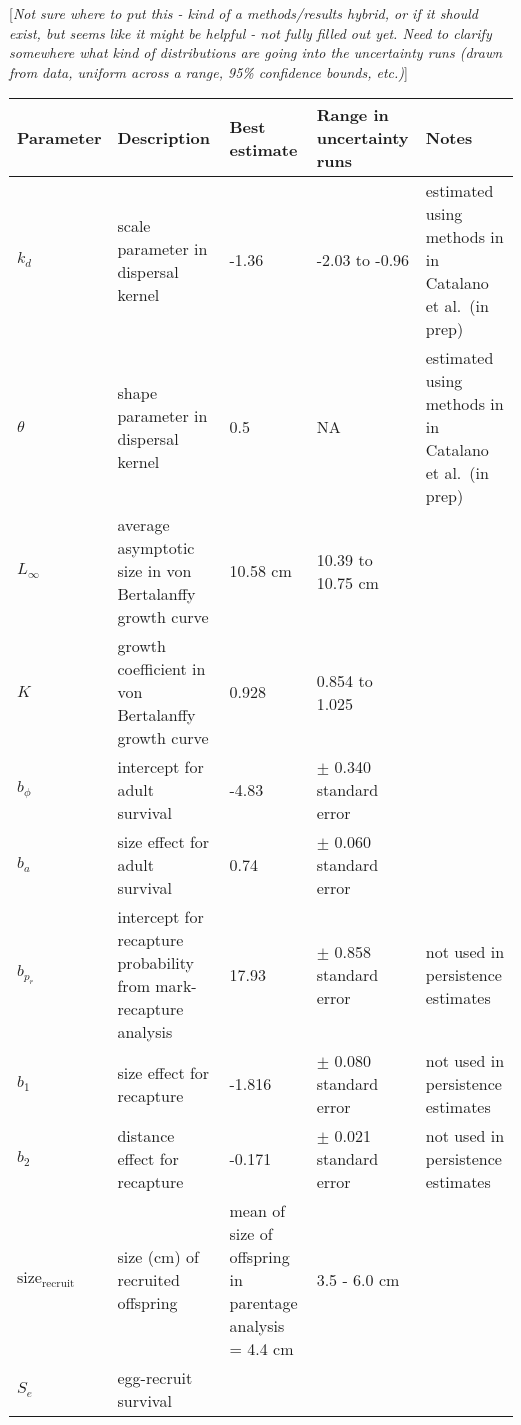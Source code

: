 \documentclass[12pt, oneside]{article}   	%
\begin{document}

[\textit{Not sure where to put this - kind of a methods/results hybrid, or if it should exist, but seems like it might be helpful - not fully filled out yet. Need to clarify somewhere what kind of distributions are going into the uncertainty runs (drawn from data, uniform across a range, 95\% confidence bounds, etc.)}]
\begin{centering}
\begin{longtable}{|p{0.8in}|p{1.2in}|p{1.5in}|p{1in}|p{1.5in}|}
\hline 
\textbf{Parameter} & \textbf{Description} & \textbf{Best estimate} & \textbf{Range in uncertainty runs} & \textbf{Notes} \\ \hline
$k_d$ & scale parameter in dispersal kernel & -1.36 & -2.03 to -0.96 & estimated using methods in \cite{bode2018estimating} in Catalano et al.\ (in prep) \\ \hline
$\theta$ & shape parameter in dispersal kernel & 0.5 & NA & estimated using methods in \cite{bode2018estimating} in Catalano et al.\ (in prep) \\ \hline
$L_\infty$ & average asymptotic size in von Bertalanffy growth curve & 10.58 cm & 10.39 to 10.75 cm &  \\ \hline
$K$ & growth coefficient in von Bertalanffy growth curve &  0.928 & 0.854 to 1.025 & \\ \hline  
$b_\phi$ & intercept for adult survival & -4.83 & $\pm$ 0.340 standard error & \\ \hline
$b_a$ & size effect for adult survival & 0.74 & $\pm$ 0.060 standard error & \\ \hline
$b_{p_r}$ & intercept for recapture probability from mark-recapture analysis & 17.93 & $\pm$ 0.858 standard error & not used in persistence estimates \\ \hline
$b_1$ & size effect for recapture & -1.816 & $\pm$ 0.080 standard error & not used in persistence estimates \\ \hline
$b_2$ & distance effect for recapture & -0.171 & $\pm$ 0.021 standard error & not used in persistence estimates \\ \hline
$\text{size}_\text{recruit}$ & size (cm) of recruited offspring & mean of size of offspring in parentage analysis = 4.4 cm & 3.5 - 6.0 cm & \\ \hline
$S_e$ & egg-recruit survival & & &  \\ \hline

\end{longtable}
\end{centering}
\end{document}
